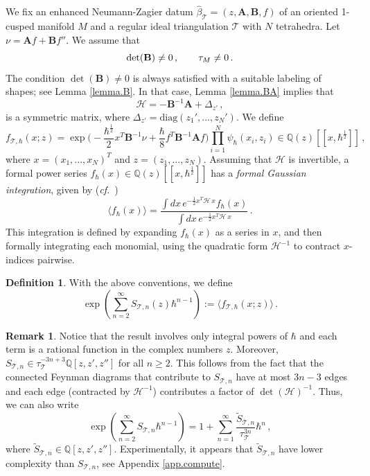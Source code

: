 \documentclass[12pt]{amsart}
\newcommand{\lbl}{\label}
\renewcommand{\eta}{\nu}
\theoremstyle{definition}
\newtheorem{definition}[theorem]{Definition}
\newtheorem{remark}[theorem]{Remark}
\def\BQ{\mathbb Q}
\def\calT{\mathcal T}
\def\la{\langle}
\def\ra{\rangle}
\def\be{  \begin{equation} }
\def\ee{  \end{equation} }
\def\diag{\text{diag}}
\def\hb{\hbar}
\newcommand{\CH}{\mathcal{H}}
\newcommand{\CT}{\mathcal{T}}
\newcommand{\wt}{\widetilde}
\newcommand{\cf}{\emph{cf.}}
\newcommand{\mb}{\mathbf}
\numberwithin{equation}{section}
\begin{document}
We fix an enhanced Neumann-Zagier datum $\widehat 
\beta_{\calT}=(z,\mb A, \mb B,f)$
of an oriented 1-cusped manifold $M$ and a regular ideal triangulation
$\calT$ with $N$ tetrahedra. Let $\eta=\mb A f + \mb B f''$. We assume that 
%
\be
\det(\mb B) \neq 0\,,\qquad  \tau_M \neq 0\,. \notag
\ee
%
The condition  $\det(\mb B) \neq 0$ is always satisfied with a suitable 
labeling of shapes; see Lemma \ref{lemma.B}. In that case,
Lemma \ref{lemma.BA} implies that 
%
\be
\CH=-\mb B^{-1}\mb A+\Delta_{z'}\,,
\ee
%
is a symmetric matrix, where 
$\Delta_{z'}=\diag(z_1',...,z_N')$. 
We define
%
\be
f_{\calT,\hb}(x;z)=
\exp \bigg(-\frac{\hbar^{\frac12}}{2} x^T \mb B^{-1} \eta +\frac\hbar8 f^T\mb B^{-1}\mb A f \bigg) 
\prod_{i=1}^N \psi_{\hb}(x_i,z_i) \in \BQ(z)[\![x,\hbar^{\frac12}]\!]\,,
\quad
\ee
%
where $x=(x_1,...,x_N)^T$ and $z=(z_1,...,z_N)$.
Assuming that $\CH$ is invertible,
a formal power series $f_\hbar(x)\in \BQ(z)[\![x,\hbar^{\frac12}]\!]$ has a {\em formal Gaussian integration}, given by (\cf\ \cite{BIZ})
%
\be \label{formalG}
\la f_{\hb}(x)\ra = \frac{\int dx \, e^{-\frac12x^T \CH \,x}f_{\hb}(x)}{\int dx \, e^{-\frac12x^T \CH \,x}}\,.
\ee
%
This integration is defined by expanding $f_\hbar(x)$ as a series in $x$, and then formally integrating each monomial, using the quadratic form $\CH^{-1}$ to contract $x$-indices pairwise. 

\begin{definition}
\lbl{def.Sn}
With the above conventions, we define
%
\be
\exp\left(\sum_{n=2}^\infty S_{\calT,n}(z) \hb^{n-1}\right)
:=
\la f_{\calT,\hb}(x;z)
\ra \,.
\ee
%
\end{definition}

\begin{remark}
\lbl{rem.tau3n}
Notice that the result involves only integral powers of $\hbar$
and each term is a rational function in the complex numbers $z$.
Moreover, $S_{\calT,n} \in \tau_{\CT}^{-3n+3} \BQ[z,z',z'']$ 
for all $n \geq 2$. This follows from the fact that the connected Feynman
diagrams that contribute to $S_{\CT,n}$ have at most $3n-3$ edges and each
edge (contracted by $\CH^{-1}$) contributes a factor of $\det(\CH)^{-1}$. 
Thus, we can also write
%
\be \label{tordivide}
\exp\left(\sum_{n=2}^\infty S_{\calT,n} \hb^{n-1}\right)=
1+ \sum_{n=1}^\infty  \frac{\wt S_{\calT,n}}{\tau_{\CT}^{3n}}\hb^n \,, 
\ee
%
where $\wt S_{\CT,n} \in \BQ[z,z',z'']$. Experimentally, it appears that
$\wt S_{\calT,n}$ have lower complexity than $S_{\calT,n}$, see Appendix 
\ref{app.compute}.
\end{remark}
\end{document}
